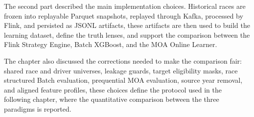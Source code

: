 The second part described the main implementation choices. Historical races are frozen into replayable Parquet snapshots, replayed through Kafka, processed by Flink, and
persisted as JSONL artifacts, these artifacts are then used to build the learning dataset, define the truth lenses, and support the comparison between the Flink Strategy
Engine, Batch XGBoost, and the MOA Online Learner.

The chapter also discussed the corrections needed to make the comparison fair: shared race and driver universes, leakage guards, target eligibility masks, race structured
Batch evaluation, prequential MOA evaluation, source year removal, and aligned feature profiles, these choices define the protocol used in the following chapter, where the
quantitative comparison between the three paradigms is reported.
